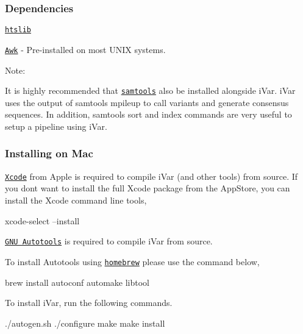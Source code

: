 \subsubsection*{Dependencies}


\begin{DoxyItemize}
\item \href{http://www.htslib.org/download/}{\tt htslib}
\item \href{https://www.cs.princeton.edu/~bwk/btl.mirror/}{\tt Awk} -\/ Pre-\/installed on most U\+N\+IX systems.
\end{DoxyItemize}

Note\+:
\begin{DoxyItemize}
\item It is highly recommended that \href{https://github.com/samtools/samtools}{\tt samtools} also be installed alongside i\+Var. i\+Var uses the output of samtools mpileup to call variants and generate consensus sequences. In addition, samtools {\ttfamily sort} and {\ttfamily index} commands are very useful to setup a pipeline using i\+Var.
\end{DoxyItemize}

\subsubsection*{Installing on Mac}

\href{https://developer.apple.com/xcode/}{\tt Xcode} from Apple is required to compile i\+Var (and other tools) from source. If you don\textquotesingle{}t want to install the full Xcode package from the App\+Store, you can install the Xcode command line tools,


\begin{DoxyCode}
xcode-select --install
\end{DoxyCode}


\href{https://www.gnu.org/software/automake/manual/html_node/Autotools-Introduction.html#Autotools-Introduction}{\tt G\+NU Autotools} is required to compile i\+Var from source.

To install Autotools using \href{https://brew.sh/}{\tt homebrew} please use the command below,


\begin{DoxyCode}
brew install autoconf automake libtool
\end{DoxyCode}


To install i\+Var, run the following commands.


\begin{DoxyCode}
./autogen.sh
./configure
make
make install
\end{DoxyCode}


